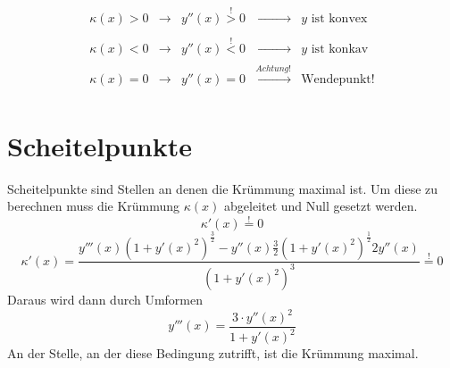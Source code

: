 \[\boxed{\begin{array}{lllll} 
	\kappa (x) > 0 & \rightarrow & y''(x) \stackrel{!}{>} 0 & \xrightarrow[]{\phantom{Achtung!}} & y \text{ ist konvex} \\
	\kappa (x) < 0 & \rightarrow & y''(x) \stackrel{!}{<} 0 & \xrightarrow[]{\phantom{Achtung!}} & y \text{ ist konkav} \\
	\kappa (x) = 0 & \rightarrow & y''(x) = 0		& \xrightarrow[]{Achtung!} & \text{Wendepunkt!}
\end{array}}\]
\section{Scheitelpunkte}
Scheitelpunkte sind Stellen an denen die Krümmung maximal ist. 
Um diese zu berechnen muss die Krümmung $\kappa (x)$ abgeleitet und Null gesetzt werden.
\[ \kappa '(x) \stackrel{!}{=} 0  \]
\[ \boxed{\kappa '(x) = \dfrac{ y'''(x)(1+y'(x)^2)^{\frac{3}{2}} - y''(x) \frac{3}{2}(1+y'(x)^2)^{\frac{1}{2}} 2y''(x) }{ (1+y'(x)^2)^3 } \stackrel{!}{=} 0 } \]
Daraus wird dann durch Umformen
\[ \boxed{y'''(x) = \frac{3 \cdot y''(x)^2}{1 + y'(x)^2}} \]
An der Stelle, an der diese Bedingung zutrifft, ist die Krümmung maximal. 